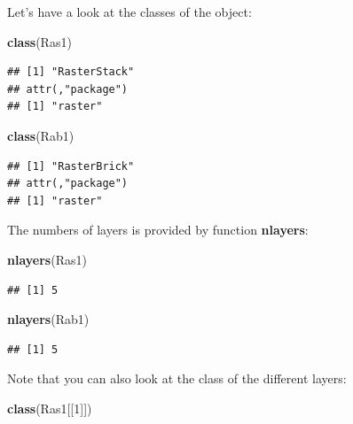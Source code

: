 \documentclass[]{report}
\newenvironment{Shaded}{\begin{snugshade}}{\end{snugshade}}
\newcommand{\KeywordTok}[1]{\textcolor[rgb]{0.13,0.29,0.53}{\textbf{{#1}}}}
\newcommand{\DecValTok}[1]{\textcolor[rgb]{0.00,0.00,0.81}{{#1}}}
\newcommand{\NormalTok}[1]{{#1}}
\begin{document}
Let's have a look at the classes of the object:

\begin{Shaded}
\begin{Highlighting}[]
\KeywordTok{class}\NormalTok{(Ras1)}
\end{Highlighting}
\end{Shaded}

\begin{verbatim}
## [1] "RasterStack"
## attr(,"package")
## [1] "raster"
\end{verbatim}

\begin{Shaded}
\begin{Highlighting}[]
\KeywordTok{class}\NormalTok{(Rab1)}
\end{Highlighting}
\end{Shaded}

\begin{verbatim}
## [1] "RasterBrick"
## attr(,"package")
## [1] "raster"
\end{verbatim}

The numbers of layers is provided by function \textbf{nlayers}:

\begin{Shaded}
\begin{Highlighting}[]
\KeywordTok{nlayers}\NormalTok{(Ras1)}
\end{Highlighting}
\end{Shaded}

\begin{verbatim}
## [1] 5
\end{verbatim}

\begin{Shaded}
\begin{Highlighting}[]
\KeywordTok{nlayers}\NormalTok{(Rab1)}
\end{Highlighting}
\end{Shaded}

\begin{verbatim}
## [1] 5
\end{verbatim}

Note that you can also look at the class of the different layers:

\begin{Shaded}
\begin{Highlighting}[]
\KeywordTok{class}\NormalTok{(Ras1[[}\DecValTok{1}\NormalTok{]])}
\end{Highlighting}
\end{Shaded}
\end{document}
